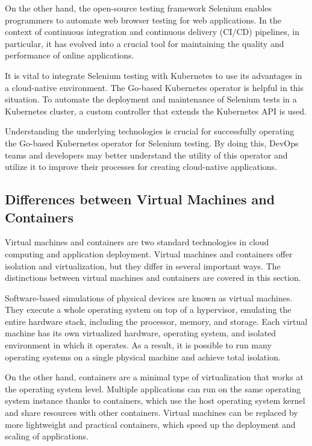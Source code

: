On the other hand, the open-source testing framework Selenium enables programmers to automate web browser testing for web applications. In the context of continuous integration and continuous delivery (CI/CD) pipelines, in particular, it has evolved into a crucial tool for maintaining the quality and performance of online applications.

It is vital to integrate Selenium testing with Kubernetes to use its advantages in a cloud-native environment. The Go-based Kubernetes operator is helpful in this situation. To automate the deployment and maintenance of Selenium tests in a Kubernetes cluster, a custom controller that extends the Kubernetes API is used.

Understanding the underlying technologies is crucial for successfully operating the Go-based Kubernetes operator for Selenium testing. By doing this, DevOps teams and developers may better understand the utility of this operator and utilize it to improve their processes for creating cloud-native applications.

\subsection{Differences between Virtual Machines and Containers}

Virtual machines and containers are two standard technologies in cloud computing and application deployment. Virtual machines and containers offer isolation and virtualization, but they differ in several important ways. The distinctions between virtual machines and containers are covered in this section.

Software-based simulations of physical devices are known as virtual machines. They execute a whole operating system on top of a hypervisor, emulating the entire hardware stack, including the processor, memory, and storage. Each virtual machine has its own virtualized hardware, operating system, and isolated environment in which it operates. As a result, it is possible to run many operating systems on a single physical machine and achieve total isolation.

On the other hand, containers are a minimal type of virtualization that works at the operating system level. Multiple applications can run on the same operating system instance thanks to containers, which use the host operating system kernel and share resources with other containers. Virtual machines can be replaced by more lightweight and practical containers, which speed up the deployment and scaling of applications.

